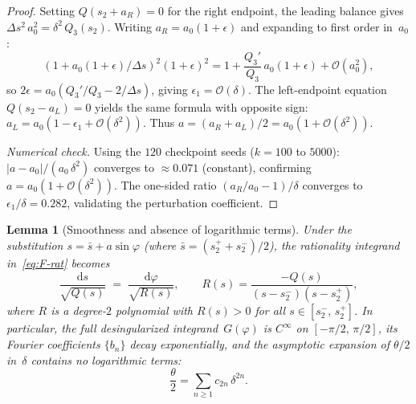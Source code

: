 \documentclass[11pt,a4paper]{article}
\theoremstyle{plain}
\newtheorem{lemma}[theorem]{Lemma}
\theoremstyle{definition}
\theoremstyle{remark}
\newcommand{\dd}{\mathrm{d}}
\newcommand{\Oo}{\mathcal{O}}
\begin{document}
\begin{proof}
  Setting $Q(s_2 + a_R) = 0$ for the right endpoint,
  the leading balance gives $\Delta s^2\,a_0^2 = \delta^2\,Q_3(s_2)$.
  Writing $a_R = a_0(1 + \epsilon)$ and expanding to first order in~$a_0$:
  \[
    (1 + a_0(1{+}\epsilon)/\Delta s)^2(1{+}\epsilon)^2
    = 1 + \frac{Q_3'}{Q_3}\,a_0(1{+}\epsilon) + \Oo(a_0^2),
  \]
  so $2\epsilon = a_0(Q_3'/Q_3 - 2/\Delta s)$, giving
  $\epsilon_1 = \Oo(\delta)$.
  The left-endpoint equation $Q(s_2 - a_L) = 0$ yields the same
  formula with opposite sign:
  $a_L = a_0(1 - \epsilon_1 + \Oo(\delta^2))$.
  Thus $a = (a_R + a_L)/2 = a_0(1 + \Oo(\delta^2))$.

  \smallskip
  \emph{Numerical check.}
  Using the $120$ checkpoint seeds ($k = 100$ to $5000$):
  $\lvert a - a_0\rvert/(a_0\,\delta^2)$ converges to
  $\approx 0.071$ (constant), confirming $a = a_0(1 + \Oo(\delta^2))$.
  The one-sided ratio $(a_R/a_0 - 1)/\delta$ converges to
  $\epsilon_1/\delta = 0.282$, validating the perturbation coefficient.
\end{proof}

\begin{lemma}[Smoothness and absence of logarithmic terms]%
\label{lem:smooth}
  Under the substitution $s = \bar s + a\sin\varphi$
  (where $\bar s = (s_2^+ + s_2^-)/2$), the rationality
  integrand in~\eqref{eq:F-rat} becomes
  \begin{equation}\label{eq:desing-factorisation}
    \frac{\dd s}{\sqrt{Q(s)}}
    \;=\;
    \frac{\dd\varphi}{\sqrt{R(s)}},
    \qquad
    R(s) = \frac{-Q(s)}{(s - s_2^-)(s - s_2^+)},
  \end{equation}
  where $R$ is a degree-$2$ polynomial with $R(s) > 0$ for
  all $s \in [s_2^-,\, s_2^+]$.
  In particular, the full desingularized integrand~$G(\varphi)$
  is $C^\infty$ on $[-\pi/2,\,\pi/2]$,
  its Fourier coefficients $\{b_n\}$ decay exponentially,
  and the asymptotic expansion of $\theta/2$ in~$\delta$ contains
  \textup{no} logarithmic terms:
  \[
    \frac{\theta}{2}
    = \sum_{n \ge 1} c_{2n}\,\delta^{2n}.
  \]
\end{lemma}
\end{document}
